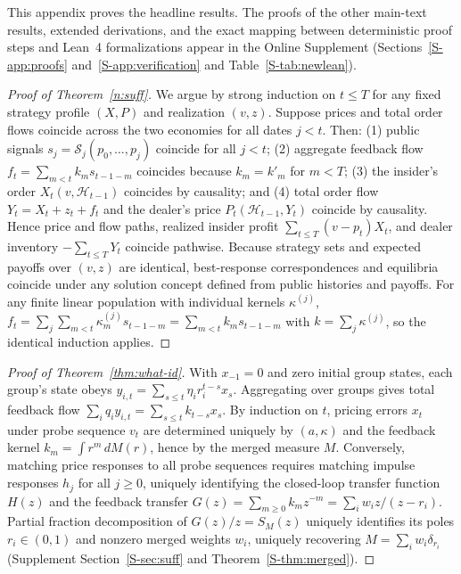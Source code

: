 \documentclass[11pt,letterpaper]{article}
\theoremstyle{definition}
\begin{document}
\noindent This appendix proves the headline results. The proofs of the other main-text results, extended derivations, and the exact mapping between deterministic proof steps and Lean~4 formalizations appear in the Online Supplement (Sections~\ref{S-app:proofs} and~\ref{S-app:verification} and Table~\ref{S-tab:newlean}).

\begin{proof}[Proof of Theorem~\ref{n:suff}]
We argue by strong induction on $t \le T$ for any fixed strategy profile $(X, P)$ and realization $(v, z)$. Suppose prices and total order flows coincide across the two economies for all dates $j < t$. Then: (1) public signals $s_j = \mathcal{S}_j(p_0, \dots, p_j)$ coincide for all $j < t$; (2) aggregate feedback flow $f_t = \sum_{m < t} k_m s_{t-1-m}$ coincides because $k_m = k'_m$ for $m < T$; (3) the insider's order $X_t(v, \mathcal{H}_{t-1})$ coincides by causality; and (4) total order flow $Y_t = X_t + z_t + f_t$ and the dealer's price $P_t(\mathcal{H}_{t-1}, Y_t)$ coincide by causality. Hence price and flow paths, realized insider profit $\sum_{t \le T}(v - p_t) X_t$, and dealer inventory $-\sum_{t \le T} Y_t$ coincide pathwise. Because strategy sets and expected payoffs over $(v, z)$ are identical, best-response correspondences and equilibria coincide under any solution concept defined from public histories and payoffs. For any finite linear population with individual kernels $\kappa^{(j)}$, $f_t = \sum_j \sum_{m < t} \kappa_m^{(j)} s_{t-1-m} = \sum_{m < t} k_m s_{t-1-m}$ with $k = \sum_j \kappa^{(j)}$, so the identical induction applies.
\end{proof}

\begin{proof}[Proof of Theorem~\ref{thm:what-id}]
With $x_{-1} = 0$ and zero initial group states, each group's state obeys $y_{i,t} = \sum_{s \le t} \eta_i r_i^{t-s} x_s$. Aggregating over groups gives total feedback flow $\sum_i q_i y_{i,t} = \sum_{s \le t} k_{t-s} x_s$. By induction on $t$, pricing errors $x_t$ under probe sequence $v_t$ are determined uniquely by $(a, \kappa)$ and the feedback kernel $k_m = \int r^m \, dM(r)$, hence by the merged measure $M$. Conversely, matching price responses to all probe sequences requires matching impulse responses $h_j$ for all $j \ge 0$, uniquely identifying the closed-loop transfer function $H(z)$ and the feedback transfer $G(z) = \sum_{m \ge 0} k_m z^{-m} = \sum_i w_i z / (z - r_i)$. Partial fraction decomposition of $G(z)/z = S_M(z)$ uniquely identifies its poles $r_i \in (0,1)$ and nonzero merged weights $w_i$, uniquely recovering $M = \sum_i w_i \delta_{r_i}$ (Supplement Section~\ref{S-sec:suff} and Theorem~\ref{S-thm:merged}).
\end{proof}
\end{document}
